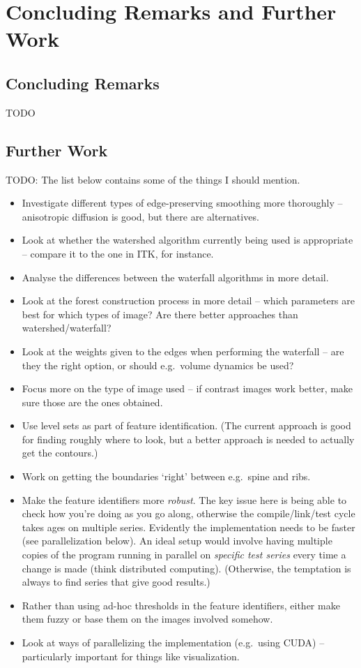 \chapter{Concluding Remarks and Further Work}
\label{chap:conclusions}

\section{Concluding Remarks}

TODO

\section{Further Work}

TODO: The list below contains some of the things I should mention.
%
\begin{itemize}
\item Investigate different types of edge-preserving smoothing more thoroughly -- anisotropic diffusion is good, but there are alternatives.
\item Look at whether the watershed algorithm currently being used is appropriate -- compare it to the one in ITK, for instance.
\item Analyse the differences between the waterfall algorithms in more detail.
\item Look at the forest construction process in more detail -- which parameters are best for which types of image? Are there better approaches than watershed/waterfall?
\item Look at the weights given to the edges when performing the waterfall -- are they the right option, or should e.g.~volume dynamics be used?
\item Focus more on the type of image used -- if contrast images work better, make sure those are the ones obtained.
\item Use level sets as part of feature identification. (The current approach is good for finding roughly where to look, but a better approach is needed to actually get the contours.)
\item Work on getting the boundaries `right' between e.g.~spine and ribs.
\item Make the feature identifiers more \emph{robust}. The key issue here is being able to check how you're doing as you go along, otherwise the compile/link/test cycle takes ages on multiple series. Evidently the implementation needs to be faster (see parallelization below). An ideal setup would involve having multiple copies of the program running in parallel on \emph{specific test series} every time a change is made (think distributed computing). (Otherwise, the temptation is always to find series that give good results.)
\item Rather than using ad-hoc thresholds in the feature identifiers, either make them fuzzy or base them on the images involved somehow.
\item Look at ways of parallelizing the implementation (e.g.~using CUDA) -- particularly important for things like visualization.
\end{itemize}
